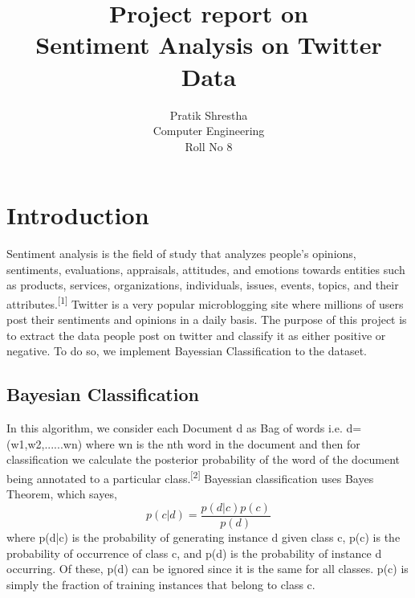 \documentclass[12pt]{article}
\begin{document}
\title{Project report on\\\textbf{Sentiment Analysis on Twitter Data}}
\author{Pratik Shrestha\\Computer Engineering\\Roll No 8}\maketitle

\newpage
\tableofcontents
\newpage

\section{Introduction }

Sentiment analysis is the field of study that analyzes people's opinions, sentiments, evaluations, appraisals, attitudes, and emotions towards entities such as products, services, organizations, individuals, issues, events, topics, and their attributes.\textsuperscript{[1]} Twitter is a very popular microblogging site where millions of users post their sentiments and opinions in a daily basis. The purpose of this project is to extract the data people post on twitter and classify it as either positive or negative. To do so, we implement Bayessian Classification to the dataset.

\subsection{Bayesian Classification}
In this algorithm, we consider each Document d as Bag of words i.e. d= (w1,w2,......wn) where wn is the nth word in the document and then for classification we calculate the posterior probability of the word of the document being annotated to a particular class.\textsuperscript{[2]}
Bayessian classification uses Bayes Theorem, which sayes,
\begin{equation} p(c|d) = \frac{p(d|c) p(c)}{p(d)} 
\end{equation}
where p(d|c) is the probability of generating instance d given class c, p(c) is the probability of occurrence of class c, and p(d) is the probability of instance d occurring. Of these, p(d) can be ignored since it is the same for all classes. p(c) is simply the fraction of training instances that belong to class c.
\end{document}
